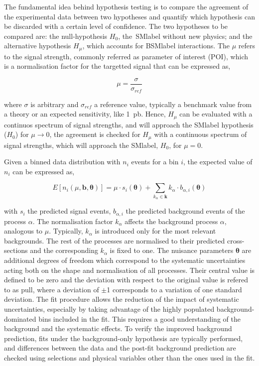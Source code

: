 The fundamental idea behind hypothesis testing is to compare the agreement of the experimental data between two hypotheses and quantify which hypothesis can be discarded with a certain level of confidence. The two hypotheses to be compared are: the null-hypothesis $H_0$, the~\acrshort{SMlabel} without new physics; and the alternative hypothesis $H_\mu$, which accounts for \acrshort{BSMlabel} interactions. The $\mu$ refers to the signal strength, commonly referred as parameter of interest (POI), which is a normalisation factor for the targetted signal that can be expressed as,

\begin{equation}
    \mu = \frac{\sigma}{\sigma_{ref}}
\end{equation}

where $\sigma$ is arbitrary and $\sigma_{ref}$ a reference value, typically a benchmark value from a theory or an expected sensitivity, like 1~pb. Hence, $H_\mu$ can be evaluated with a continuos spectrum of signal strengths, and will approach the \acrshort{SMlabel} hypothesis ($H_0$) for $\mu\to0$, the agreement is checked for $H_\mu$ with a continuous spectrum of signal strengths, which will approach the \acrshort{SMlabel}, $H_0$, for $\mu=0$.

Given a binned data distribution with $n_i$ events for a bin $i$, the expected value of $n_i$ can be expressed as,

\begin{equation}
    E[n_i(\mu,\mathbf{b},\boldsymbol{\theta})] = \mu\cdot s_i(\boldsymbol{\theta}) + \sum_{k_{\alpha}\in\mathbf{k}}k_\alpha\cdot b_{\alpha,i}(\boldsymbol{\theta})
\end{equation}

with $s_i$ the predicted signal events, $b_{\alpha,i}$ the predicted background events of the process $\alpha$. The normalisation factor $k_\alpha$ affects the background process $\alpha$, analogous to $\mu$. Typically, $k_\alpha$ is introduced only for the most relevant backgrounds. The rest of the processes are normalised to their predicted cross-sections and the corresponding $k_\alpha$ is fixed to one. The nuisance parameters $\boldsymbol{\theta}$ are additional degrees of freedom which correspond to the systematic uncertainties acting both on the shape and normalisation of all processes. Their central value is defined to be zero and the deviation with respect to the original value is refered to as pull, where a deviation of $\pm$1 corresponds to a variation of one standard deviation. The fit procedure allows the reduction of the impact of systematic uncertainties, especially by taking advantage of the highly populated background-dominated bins included in the fit. This requires a good understanding of the background and the systematic effects. To verify the improved background prediction, fits under the background-only hypothesis are typically performed, and differences between the data and the post-fit background prediction are checked using selections and physical variables other than the ones used in the fit.

